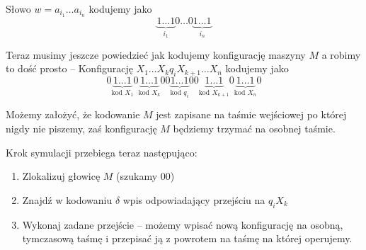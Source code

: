 Słowo \( w = a_{i_1} \dots a_{i_n} \) kodujemy jako
\[
    \underbrace{1 \dots 1}_{i_1} 0 \dots 0 \underbrace{1 \dots 1}_{i_n}
\]

Teraz musimy jeszcze powiedzieć jak kodujemy konfigurację maszyny \( M \) a robimy to dość prosto --
Konfigurację \( X_1 \dots X_k q_i X_{k+1} \dots X_n \) kodujemy jako
\[
    0\underbrace{1 \dots 1}_{\text{kod } X_1} 0 \underbrace{1 \dots 1}_{\text{kod } X_k} 00 \underbrace{1 \dots 1}_{\text{kod } q_i} 00 \underbrace{1 \dots 1}_{\text{kod } X_{k + 1}} 0 \underbrace{1 \dots 1}_{\text{kod } X_n} 0
\]

Możemy założyć, że kodowanie \( M \) jest zapisane na taśmie wejściowej po której nigdy nie piszemy, zaś konfigurację \( M \) będziemy trzymać na osobnej taśmie.

Krok symulacji przebiega teraz następująco:
\begin{enumerate}
    \item Zlokalizuj głowicę \( M \) (szukamy \( 00 \))
    \item Znajdź w kodowaniu \( \delta \) wpis odpowiadający przejściu na \( q_i X_k \)
    \item Wykonaj zadane przejście -- możemy wpisać nową konfigurację na osobną, tymczasową taśmę i przepisać ją z powrotem na taśmę na której operujemy.
    
\end{enumerate}
